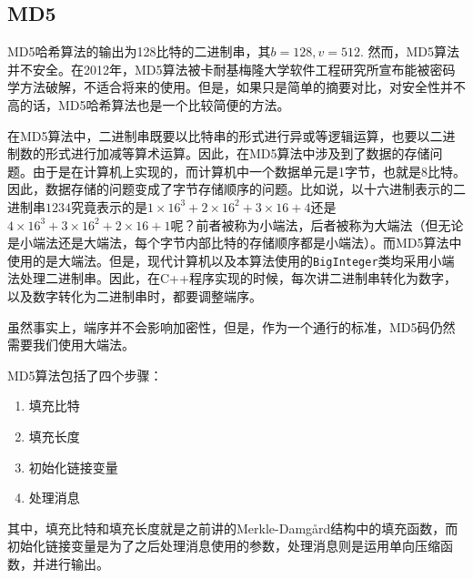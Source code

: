 \subsection{MD5}
MD5哈希算法的输出为128比特的二进制串，其$b=128, v=512$. 然而，MD5算法并不安全。在2012年，MD5算法被卡耐基梅隆大学软件工程研究所宣布能被密码学方法破解，不适合将来的使用。但是，如果只是简单的摘要对比，对安全性并不高的话，MD5哈希算法也是一个比较简便的方法。\par
在MD5算法中，二进制串既要以比特串的形式进行异或等逻辑运算，也要以二进制数的形式进行加减等算术运算。因此，在MD5算法中涉及到了数据的存储问题。由于是在计算机上实现的，而计算机中一个数据单元是1字节，也就是8比特。因此，数据存储的问题变成了字节存储顺序的问题。比如说，以十六进制表示的二进制串$1234$究竟表示的是$1\times 16^3+2\times 16^2+3\times 16+4$还是$4\times 16^3+3\times 16^2+2\times 16+1$呢？前者被称为小端法，后者被称为大端法（但无论是小端法还是大端法，每个字节内部比特的存储顺序都是小端法）。而MD5算法中使用的是大端法。但是，现代计算机以及本算法使用的\verb`BigInteger`类均采用小端法处理二进制串。因此，在C++程序实现的时候，每次讲二进制串转化为数字，以及数字转化为二进制串时，都要调整端序。\par
虽然事实上，端序并不会影响加密性，但是，作为一个通行的标准，MD5码仍然需要我们使用大端法。\par
MD5算法包括了四个步骤：
\begin{enumerate}
	\item 填充比特
	\item 填充长度
	\item 初始化链接变量
	\item 处理消息
\end{enumerate}

其中，填充比特和填充长度就是之前讲的Merkle-Damg\aa rd结构中的填充函数，而初始化链接变量是为了之后处理消息使用的参数，处理消息则是运用单向压缩函数，并进行输出。
